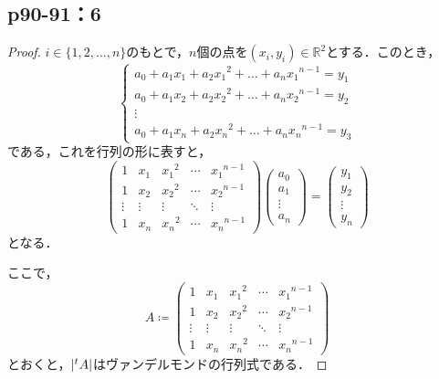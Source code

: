 \documentclass[uplatex,dvipdfmx,a4paper,11pt,fleqn]{jsarticle}
\begin{document}
\newpage 

\subsection*{p90-91：6}

\begin{tleftbar}
    \begin{proof}
        $i \in \{ 1,2,\ldots,n \}$のもとで，$n$個の点を$(x_i , y_i ) \in \mathbb{R}^2$とする．このとき，
        \[
            \begin{cases} 
                a_0 + a_1 x_1 + a_2 {x_1}^2 + \dots + a_n {x_1}^{n-1} = y_1 \\
                a_0 + a_1 x_2 + a_2 {x_2}^2 + \dots + a_n {x_2}^{n-1} = y_2\\
                \vdots \\
                a_0 + a_1 x_n + a_2 {x_n}^2 + \dots + a_n {x_n}^{n-1} = y_3
            \end{cases}
        \]
        である，これを行列の形に表すと，
        \[
            \begin{pmatrix} 
                1 & x_1 & {x_1}^2 & \cdots & {x_1}^{n-1} \\
                1 & x_2 & {x_2}^2 & \cdots & {x_2}^{n-1} \\
                \vdots & \vdots & \vdots & \ddots & \vdots \\
                1 & x_n & {x_n}^2 & \cdots & {x_n}^{n-1}
            \end{pmatrix}
            \begin{pmatrix}
                a_0 \\
                a_1 \\
                \vdots \\
                a_n
            \end{pmatrix}
            =
            \begin{pmatrix}
                y_1 \\
                y_2 \\
                \vdots \\
                y_n
            \end{pmatrix}
        \]
        となる．

        ここで，
        \[
            A \coloneqq 
        \begin{pmatrix} 
            1 & x_1 & {x_1}^2 & \cdots & {x_1}^{n-1} \\
            1 & x_2 & {x_2}^2 & \cdots & {x_2}^{n-1} \\
            \vdots & \vdots & \vdots & \ddots & \vdots \\
            1 & x_n & {x_n}^2 & \cdots & {x_n}^{n-1}
        \end{pmatrix}
        \]
        とおくと，$\abs{{}^t A}$はヴァンデルモンドの行列式である．


\end{proof}
\end{tleftbar}
\end{document}
